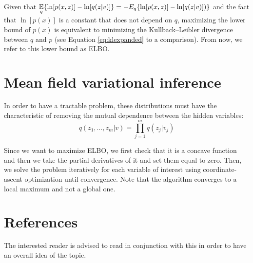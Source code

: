 Given that $ \displaystyle \operatorname*{\mathbb{E}}_q \{\ln[p(x,z)] - \ln[q(z | v)]\} = - E_q \{ \ln[p(x,z)] -\ln[q(z | v)]) \}$
and the fact that $\ln[p(x)]$ is a constant that does not depend on $q$,
maximizing the lower bound of $p(x)$ is equivalent to minimizing the Kullback–Leibler divergence between $q$ and $p$ (see Equation \ref{eq:klexpanded} to a comparison).
From now, we refer to this lower bound as ELBO.

\section{Mean field variational inference}
In order to have a tractable problem, these distributions must have the characteristic
of removing the mutual dependence between the hidden variables:
\[ q(z_1, ..., z_m| v) = \prod_{j=1}^m q(z_j | v_j) \]

Since we want to maximize ELBO, we first check that it is a concave function
and then we take the partial derivatives of it and set them equal to zero.
Then, we solve the problem iteratively for each variable of interest using coordinate-ascent optimization until convergence.
Note that the algorithm converges to a local maximum and not a global one.

\section{References}
The interested reader is advised to read \cite{Blei_2017} in conjunction with this in order to have an overall idea of the topic.